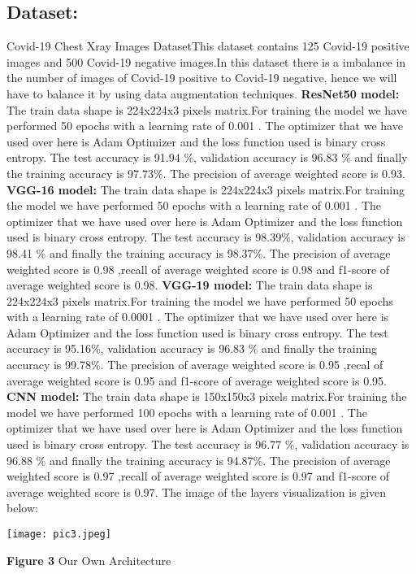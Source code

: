 \documentclass[journal]{IEEEtran}
\begin{document}
\subsection{Dataset:}
Covid-19 Chest Xray Images Dataset\cite{Kaggle-Dataset}This dataset contains 125 Covid-19 positive images and 500 Covid-19 negative images.In this dataset there is a imbalance in the number of images of Covid-19 positive to Covid-19 negative, hence we will have to balance it by using data augmentation techniques.
\newline
\textbf{ResNet50 model:}\newline
The train data shape is 224x224x3 pixels matrix.For training the model we have performed 50 epochs with a learning rate of 0.001 . The optimizer that we have used over here is Adam Optimizer and the loss function used is binary cross entropy. The test accuracy is 91.94 $\%$, validation accuracy is 96.83 $\%$ and finally the training accuracy is 97.73$\%$. The precision of average weighted score is 0.93. \newline
\textbf{VGG-16 model:}\newline
The train data shape is 224x224x3 pixels matrix.For training the model we have performed 50 epochs with a learning rate of 0.001 . The optimizer that we have used over here is Adam Optimizer and the loss function used is binary cross entropy. The test accuracy is 98.39$\%$, validation accuracy is 98.41 $\%$ and finally the training accuracy is 98.37$\%$. The precision of average weighted score is 0.98 ,recall of average weighted score is 0.98 and f1-score of average weighted score is 0.98.\newline
\textbf{VGG-19 model:}\newline
The train data shape is 224x224x3 pixels matrix.For training the model we have performed 50 epochs with a learning rate of 0.0001 . The optimizer that we have used over here is Adam Optimizer and the loss function used is binary cross entropy. The test accuracy is 95.16$\%$, validation accuracy is 96.83 $\%$ and finally the training accuracy is 99.78$\%$. The precision of average weighted score is 0.95 ,recal of average weighted score is 0.95 and f1-score of average weighted score is 0.95. \newline
\textbf{CNN model:}\newline
The train data shape is 150x150x3 pixels matrix.For training the model we have performed 100 epochs with a learning rate of 0.001 . The optimizer that we have used over here is Adam Optimizer and the loss function used is binary cross entropy. The test accuracy is 96.77 $\%$, validation accuracy is 96.88 $\%$ and finally the training accuracy is 94.87$\%$. The precision of average weighted score is 0.97 ,recall of average weighted score is 0.97 and f1-score of average weighted score is 0.97.\newline
The image of the layers visualization is given below:
\begin{center}
\texttt{[image: pic3.jpeg]}
    \item{\footnotesize{\textbf {Figure 3} Our Own Architecture}}
\end{center}
\end{document}
